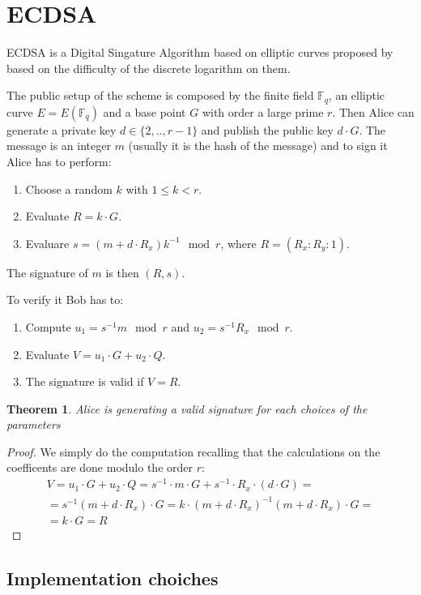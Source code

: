 \documentclass{article}
\newcommand{\F}{\mathbb{F}}
\theoremstyle{plain}
\newtheorem{teo}{Theorem}[section]
\theoremstyle{remark}
\theoremstyle{definition}
\begin{document}
\section{ECDSA}

ECDSA is a Digital Singature Algorithm based on elliptic curves proposed by \cite{ECDSA} based on the difficulty of the discrete logarithm on them. 

The public setup of the scheme is composed by the finite field $\F_q$, an elliptic curve $E = E(\F_q)$ and a base point $G$ with order a large prime $r$. Then Alice can generate a private key $d\in \{2,..,r-1\}$ and publish the public key $d\cdot G$. The message is an integer $m$ (usually it is the hash of the message) and to sign it Alice has to perform:
\begin{enumerate}
	\item Choose a random $k$ with $1 \leq k < r$.
	\item Evaluate $R = k \cdot G$.
	\item Evaluare $ s = (m + d\cdot R_x) k^{-1} \mod r$, where $R = (R_x : R_y : 1)$.
\end{enumerate}
The signature of $m$ is then $(R,s)$.

To verify it Bob has to:
\begin{enumerate}
	\item Compute $u_1 = s^{-1} m \mod r$ and $u_2 = s^{-1} R_x  \mod r$.
	\item Evaluate $V = u_1 \cdot G + u_2 \cdot Q$. 
	\item The signature is valid if $V = R$.
\end{enumerate}

\begin{teo}
	Alice is generating a valid signature for each choices of the parameters
\end{teo}
\begin{proof}
	We simply do the computation recalling that the calculations on the coefficents are done modulo the order $r$:
	\begin{multline*}
		V = u_1 \cdot G + u_2 \cdot Q = s^{-1} \cdot m \cdot G + s^{-1} \cdot R_x \cdot (d \cdot G) = \\
		= s^{-1} (m + d\cdot R_x) \cdot G = k\cdot (m + d\cdot R_x)^{-1} (m + d\cdot R_x) \cdot G = \\
		= k \cdot G = R
	\end{multline*}
\end{proof}


\subsection{Implementation choiches}
\end{document}
